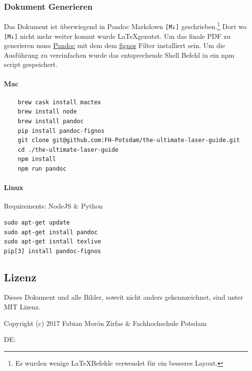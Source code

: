 \documentclass[]{article}
\let\oldparagraph\paragraph
\renewcommand{\paragraph}[1]{\oldparagraph{#1}\mbox{}}
\begin{document}
\hypertarget{dokument-generieren}{%
\subsubsection{Dokument Generieren}\label{dokument-generieren}}

Das Dokument ist überwiegend in Pandoc Markdown \texttt{{[}M↓{]}}
geschrieben.\footnote{Es wurden wenige \LaTeX  Befehle verwendet für ein
  besseres Layout.} Dort wo \texttt{{[}M↓{]}} nicht mehr weiter kommt
wurde \LaTeX genutzt. Um das finale PDF zu generieren muss
\href{https://pandoc.org/}{Pandoc} mit dem dem
\href{https://github.com/tomduck/pandoc-fignos}{fignos} Filter
installiert sein. Um die Ausführung zu vereinfachen wurde das
entsprechende Shell Befehl in ein npm script gespeichert.

\hypertarget{mac}{%
\paragraph{Mac}\label{mac}}

\begin{verbatim}
    brew cask install mactex
    brew install node
    brew install pandoc
    pip install pandoc-fignos
    git clone git@github.com:FH-Potsdam/the-ultimate-laser-guide.git
    cd ./the-ultimate-laser-guide
    npm install
    npm run pandoc
\end{verbatim}

\hypertarget{linux}{%
\paragraph{Linux}\label{linux}}

Requirements: NodeJS \& Python

\begin{verbatim}
sudo apt-get update
sudo apt-get install pandoc
sudo apt-get isntall texlive
pip[3] install pandoc-fignos
\end{verbatim}

\hypertarget{lizenz}{%
\subsection{Lizenz}\label{lizenz}}

Dieses Dokument und alle Bilder, soweit nicht anders gekennzeichnet,
sind unter MIT Lizenz.

Copyright (c) 2017 Fabian Morón Zirfas \& Fachhochschule Potsdam

DE:
\end{document}
